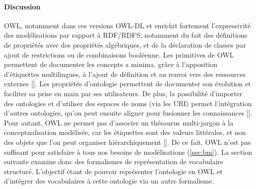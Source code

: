 





\paragraph{Discussion}
OWL, notamment dans ces versions OWL-DL et  enrichit fortement l'expressivité des modélisations par rapport à RDF/RDFS, notamment du fait des définitions de propriétés avec des propriétés algébriques, et de la déclaration de classes par ajout de restrictions ou de combinaisons booléenne.
Les primitives de OWL permettent de documenter les concepts a minima, grâce à l'apposition d'étiquettes multilingues, à l'ajout de définition et au renvoi vers des ressources externes []. 
Les propriétés d'ontologie permettent de documenter son évolution et faciliter sa prise en main par ses utilisateurs.
De plus, la possibilité d'importer des ontologies et d'utiliser des espaces de noms (via les URI) permet l'intégration d'autres ontologies, qu'on peut ensuite aligner pour fusionner les connaissances [].
Pour autant, OWL ne permet pas d'associer un thésaurus multi-jargon à la conceptualisation modélisée, car les étiquettes sont des valeurs littérales, et non des objets que l'on peut organiser hiérarchiquement [].
De ce fait, OWL n'est pas suffisant pour satisfaire à tous nos besoins de modélisations (\ref{sec:bm}).
La section suivante examine donc des formalismes de représentation de vocabulaire structuré.
L'objectif étant de pouvoir représenter l'ontologie en OWL et d'intégrer des vocabulaires à cette ontologie via un autre formalisme.








